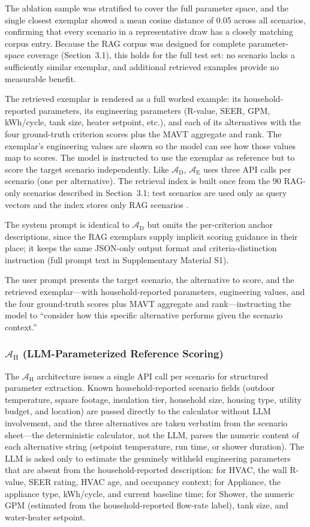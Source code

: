 \documentclass[a4paper,fleqn]{cas-dc}
\begin{document}
The ablation sample was stratified to cover the full parameter space, and the single closest exemplar showed a mean cosine distance of 0.05 across all scenarios, confirming that every scenario in a representative draw has a closely matching corpus entry. Because the RAG corpus was designed for complete parameter-space coverage (Section~3.1), this holds for the full test set: no scenario lacks a sufficiently similar exemplar, and additional retrieved examples provide no measurable benefit.

The retrieved exemplar is rendered as a full worked example: its household-reported parameters, its engineering parameters (R-value, SEER, GPM, kWh/cycle, tank size, heater setpoint, etc.), and each of its alternatives with the four ground-truth criterion scores plus the MAVT aggregate and rank. The exemplar's engineering values are shown so the model can see how those values map to scores. The model is instructed to use the exemplar as reference but to score the target scenario independently. Like $\mathcal{A}_{\text{D}}$, $\mathcal{A}_{\text{E}}$ uses three API calls per scenario (one per alternative). The retrieval index is built once from the 90 RAG-only scenarios described in Section~3.1; test scenarios are used only as query vectors and the index stores only RAG scenarios \citep{lewis2020}.

The system prompt is identical to $\mathcal{A}_{\text{D}}$ but omits the per-criterion anchor descriptions, since the RAG exemplars supply implicit scoring guidance in their place; it keeps the same JSON-only output format and criteria-distinction instruction (full prompt text in Supplementary Material S1).


\noindent The user prompt presents the target scenario, the alternative to score, and the retrieved exemplar---with household-reported parameters, engineering values, and the four ground-truth scores plus MAVT aggregate and rank---instructing the model to ``consider how this specific alternative performs given the scenario context.'' 

\subsubsection{\texorpdfstring{$\mathcal{A}_{\text{H}}$}{A_H} (LLM-Parameterized Reference Scoring)}
The $\mathcal{A}_{\text{H}}$ architecture issues a single API call per scenario for structured parameter extraction. Known household-reported scenario fields (outdoor temperature, square footage, insulation tier, household size, housing type, utility budget, and location) are passed directly to the calculator without LLM involvement, and the three alternatives are taken verbatim from the scenario sheet---the deterministic calculator, not the LLM, parses the numeric content of each alternative string (setpoint temperature, run time, or shower duration). The LLM is asked only to estimate the genuinely withheld engineering parameters that are absent from the household-reported description: for HVAC, the wall R-value, SEER rating, HVAC age, and occupancy context; for Appliance, the appliance type, kWh/cycle, and current baseline time; for Shower, the numeric GPM (estimated from the household-reported flow-rate label), tank size, and water-heater setpoint.
\end{document}
